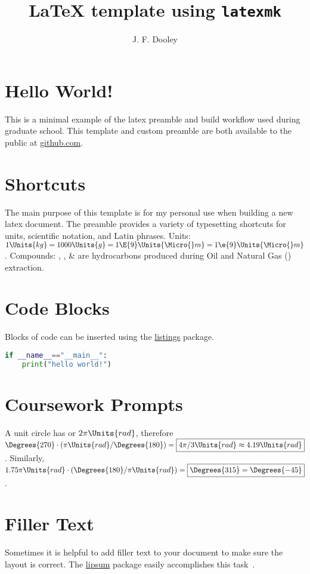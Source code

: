 \documentclass[12pt]{article}
\author{J. F. Dooley}
\title{\LaTeX{} template using \texttt{latexmk}}
\begin{document}
\maketitle

\section{Hello World!}
This is a minimal example of the latex preamble and build workflow used during graduate school.
This template and custom preamble are both available to the public at \href{https://github.com/jfdoolster}{github.com}.

\section{Shortcuts}
The main purpose of this template is for my personal use when building a new latex document. The preamble provides a variety of typesetting shortcuts for units, scientific notation, and Latin phrases.
%
Units: $1\Units{kg} = 1000\Units{g} = 1\E{9}\Units{\Micro{}m} = 1\e{9}\Units{\Micro{}m}$.
%
Compounds: \Methane{}, \CarbonDioxide{}, \& \Ethane{} are hydrocarbons produced during Oil and Natural Gas (\ONG{}) extraction.


\section{Code Blocks}
Blocks of code can be inserted using the \href{hhttps://ctan.org/pkg/listings}{listings} package.

\begin{lstlisting}[language=Python, caption={Python Code Example}]
if __name__=="__main__":
    print("hello world!")
\end{lstlisting}



\section{Coursework Prompts}

%
A unit circle has  or $2\pi\Units{rad}$, therefore $\Degrees{270} \cdot \left(\pi\Units{rad}/\Degrees{180}\right) = \boxed{4\pi/3 \Units{rad} \approx 4.19\Units{rad}}$. Similarly, $1.75\pi\Units{rad} \cdot \left(\Degrees{180}/\pi\Units{rad}\right) = \boxed{\Degrees{315} = \Degrees{-45}}$.




\section{Filler Text}
Sometimes it is helpful to add filler text to your document to make sure the layout is correct. The \href{https://ctan.org/pkg/lipsum}{lipsum} package easily accomplishes this task~\cite{LaTeX2020,Kerrisk2010}.
\lipsum[1]




\end{document}
